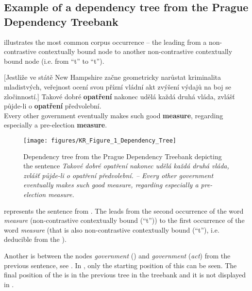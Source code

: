 \documentclass[output=paper]{langsci/langscibook.cls}
\begin{document}
\subsection{Example of a dependency tree from the Prague Dependency Treebank\label{rysova_k:sec:ExampleOfADependencyTree}}

 illustrates the most common corpus occurrence -- the  leading from a non-contrastive contextually bound node to another non-contrastive contextually bound node (i.e. from ``t'' to ``t'').

\ea
\label{rysova_k:example:2}
[Jestliže ve státě New Hampshire začne geometricky narůstat kriminalita mladistvých, veřejnost ocení svou přízní vládní akt zvýšení výdajů na boj se zločinností.] {\cb} 
Takové dobré \textbf{opatření} nakonec udělá každá druhá vláda, zvlášť půjde-li o \textbf{opatření} předvolební. \\
Every other government eventually makes such good \textbf{measure}, regarding especially a pre-election \textbf{measure}.
\z


\begin{figure}[h]
\texttt{[image: figures/KR\_Figure\_1\_Dependency\_Tree]}
\caption{Dependency tree from the Prague Dependency Treebank depicting the sentence \textit{Takové dobré opatření nakonec udělá každá druhá vláda, zvlášť půjde-li o opatření předvolební. -- Every other government eventually makes such good measure, regarding especially a pre-election measure.}}
\label{rysova_k:fig:1}
\end{figure}

 represents the sentence from . The  leads from the second occurrence of the word \textit{measure} (non-contrastive contextually bound (``t'')) to the first occurrence of the word \textit{measure} (that is also non-contras\-tive contextually bound (``t''), i.e. deducible from the ). 

Another  is between the nodes\textit{ government} () and \textit{government} (\textit{act}) from the previous sentence, see . In , only the starting position of this  can be seen. The final position of the  is in the previous tree in the treebank and it is not displayed in .
\end{document}

